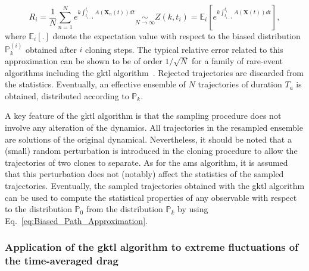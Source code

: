 \documentclass[pre,aps,floatfix,10pt,superscriptaddress, notitlepage,preprint]{revtex4-1}
\begin{document}
\begin{equation}
R_{i}=\frac{1}{N}\sum_{n=1}^{N}e^{k\int_{t_{i-1}}^{t_{i}}A(\mathbf{X}_{n}(t))dt}\underset{N\rightarrow\infty}{\sim} Z(k,t_i)= \mathbb{E}_{i}\left[e^{k\int_{t_{i-1}}^{t_{i}}A(\mathbf{X}(t))dt}\right],
\label{eq:Mean_Field_Approximation}
\end{equation}
where $\mathbb{E}_{i}[.]$ denote the expectation value with respect to the biased distribution $\mathbb{P}_k^{(i)}$ obtained after $i$ cloning steps.
The typical relative error related to this approximation can be shown to be of order $1/\sqrt{N}$ for a family of rare-event algorithms including the \ac{gktl} algorithm~\cite{DelMoralBook,DelMoral2013}.
%
Rejected trajectories are discarded from the statistics.
Eventually, an effective ensemble of $N$ trajectories of duration $T_{a}$ is obtained, distributed according to $\mathbb{P}_{k}$.


A key feature of the \ac{gktl} algorithm is that the sampling procedure does not involve any alteration of the dynamics. All trajectories in the resampled ensemble are solutions of the original dynamical. 
{Nevertheless, it should be noted that a (small) random perturbation is introduced in the cloning procedure to allow the trajectories of two clones to separate. 
As for the \ac{ams} algorithm, it is assumed that this perturbation does not (notably) affect the statistics of the sampled trajectories.}
% 
%
%
Eventually, the sampled trajectories obtained with the \ac{gktl} algorithm can be used to compute the statistical properties of any observable with respect to the distribution $\mathbb{P}_{0}$ from the distribution $\mathbb{P}_{k}$ by using Eq.~\eqref{eq:Biased_Path_Approximation}.
%


\subsubsection{Application of the \ac{gktl} algorithm to extreme fluctuations of the time-averaged drag}
\label{sec:gktl_drag}
\end{document}
